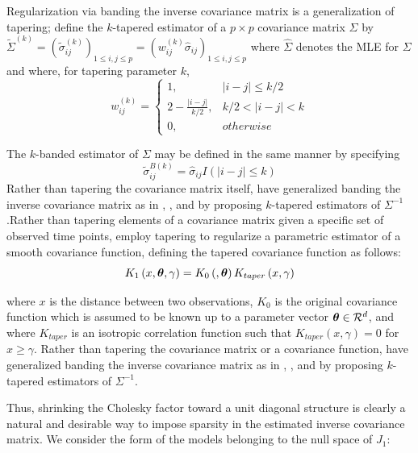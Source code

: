 \documentclass[12pt]{article}
\newcommand{\bftheta}{\mbox{\boldmath $\theta$}}
\begin{document}
Regularization via banding the inverse covariance matrix is a generalization of tapering; \cite{cai2010optimal} define the $k$-tapered estimator of a $p \times p$ covariance matrix $\Sigma$ by $\tilde{\Sigma}^{\left(k\right)} = \left( \tilde{\sigma}_{ij}^{\left(k\right)} \right)_{1 \le i,j\le p} = \left( w_{ij}^{\left(k\right)}\hat{\sigma}_{ij} \right)_{1 \le i,j\le p}$ where $\hat{\Sigma}$ denotes the MLE for $\Sigma$ and where, for tapering parameter $k$,
\[
w_{ij}^{\left(k\right)} = \left\{ \begin{array}{ll} 1,& \vert i-j \vert \le k/2 \\ 2 - \frac{\vert i-j \vert}{k/2},& k/2 < \vert i-j \vert < k  \\  0, & otherwise    \end{array}\right.
\]

The $k$-banded estimator of $\Sigma$ may be defined in the same manner by specifying 
\[
\tilde{\sigma}_{ij}^{B\left(k\right)} = \hat{\sigma}_{ij}I\left( \vert i-j \vert \le k \right)
\]
Rather than tapering the covariance matrix itself, \cite{cai2012estimating} have generalized banding the inverse covariance matrix as in \cite{bickel2008regularized}, \cite{huang2007estimation}, and \cite{levina2008sparse} by proposing $k$-tapered estimators of $\Sigma^{-1}$.Rather than tapering elements of a covariance matrix given a specific set of observed time points, \cite{kaufman2008covariance} employ tapering to regularize a parametric estimator of a smooth covariance function, defining the tapered covariance function as follows:
\[
K_1\left(x, \bftheta, \gamma \right) = K_0\left(,\bftheta \right) K_{taper}\left( x,\gamma \right) 
\]

where $x$ is the distance between two observations, $K_0$ is the original covariance function which is assumed to be known up to a parameter vector $\bftheta \in \mathcal{R}^d$, and where $K_{taper}$ is an isotropic correlation function such that $K_{taper}\left(x,\gamma\right) = 0$ for $x \ge \gamma$. Rather than tapering the covariance matrix or a covariance function, \cite{cai2012estimating} have generalized banding the inverse covariance matrix as in \cite{bickel2008regularized}, \cite{huang2007estimation}, and \cite{levina2008sparse} by proposing $k$-tapered estimators of $\Sigma^{-1}$.

Thus, shrinking the Cholesky factor toward a unit diagonal structure is clearly a natural and desirable way to impose sparsity in the estimated inverse covariance matrix. We consider the form of the models belonging to the null space of $J_1$:
\end{document}
